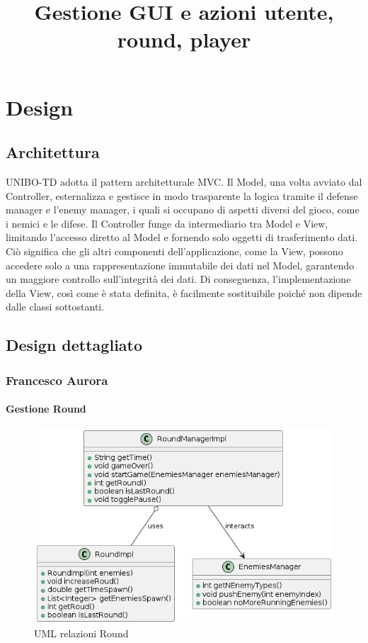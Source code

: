 \documentclass[a4paper,12pt]{report}
\begin{document}
\chapter{Design}

\section{Architettura}

UNIBO-TD adotta il pattern architetturale MVC. Il Model, una volta avviato dal Controller, esternalizza e gestisce in modo trasparente la logica tramite il defense manager e l'enemy manager, i quali si occupano di aspetti diversi del gioco, come i nemici e le difese. Il Controller funge da intermediario tra Model e View, limitando l'accesso diretto al Model e fornendo solo oggetti di trasferimento dati. Ciò significa che gli altri componenti dell'applicazione, come la View, possono accedere solo a una rappresentazione immutabile dei dati nel Model, garantendo un maggiore controllo sull'integrità dei dati. Di conseguenza, l'implementazione della View, così come è stata definita, è facilmente sostituibile poiché non dipende dalle classi sottostanti.




\newpage
\section{Design dettagliato}
\subsection{Francesco Aurora}
\title{\textbf{Gestione GUI e azioni utente, round, player}}
\subsubsection{Gestione Round}

\begin{figure}[H]
    \centering
    \includegraphics[scale=1]{Round}
    \caption{UML relazioni Round}
    \label{fig:round}
\end{figure}
\end{document}
